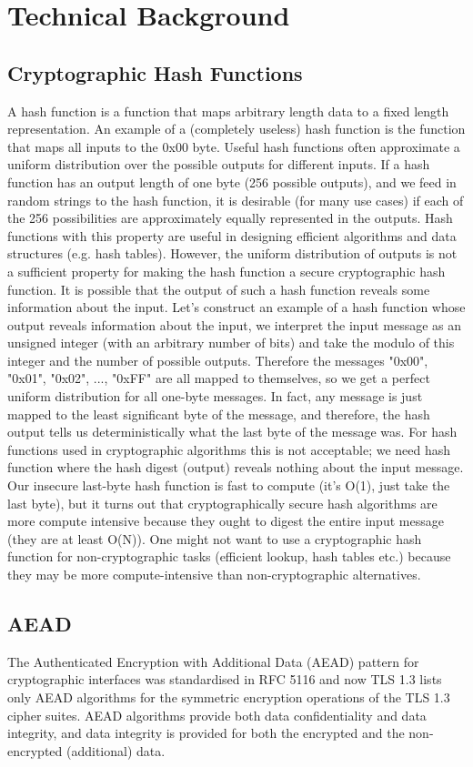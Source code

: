 \chapter{Technical Background}
\section{Cryptographic Hash Functions}
A hash function is a function that maps arbitrary length data to a fixed length representation. An example of a (completely useless) hash function is the function that maps all inputs to the 0x00 byte. Useful hash functions often approximate a uniform distribution over the possible outputs for different inputs. If a hash function has an output length of one byte (256 possible outputs), and we feed in random strings to the hash function, it is desirable (for many use cases) if each of the 256 possibilities are approximately equally represented in the outputs. Hash functions with this property are useful in designing efficient algorithms and data structures (e.g. hash tables). However, the uniform distribution of outputs is not a sufficient property for making the hash function a secure cryptographic hash function. It is possible that the output of such a hash function reveals some information about the input. Let's construct an example of a hash function whose output reveals information about the input, we interpret the input message as an unsigned integer (with an arbitrary number of bits) and take the modulo of this integer and the number of possible outputs. Therefore the messages "0x00", "0x01", "0x02", ..., "0xFF" are all mapped to themselves, so we get a perfect uniform distribution for all one-byte messages. In fact, any message is just mapped to the least significant byte of the message, and therefore, the hash output tells us deterministically what the last byte of the message was. For hash functions used in cryptographic algorithms this is not acceptable; we need hash function where the hash digest (output) reveals nothing about the input message. Our insecure last-byte hash function is fast to compute (it's O(1), just take the last byte), but it turns out that cryptographically secure hash algorithms are more compute intensive because they ought to digest the entire input message (they are at least O(N)). One might not want to use a cryptographic hash function for non-cryptographic tasks (efficient lookup, hash tables etc.) because they may be more compute-intensive than non-cryptographic alternatives.


\section{AEAD}
The Authenticated Encryption with Additional Data (AEAD) pattern for cryptographic interfaces was standardised in RFC 5116 \cite{rfc5116-aead} and now TLS 1.3 lists only AEAD algorithms for the symmetric encryption operations of the TLS 1.3 cipher suites. AEAD algorithms provide both data confidentiality and data integrity, and data integrity is provided for both the encrypted and the non-encrypted (additional) data.

